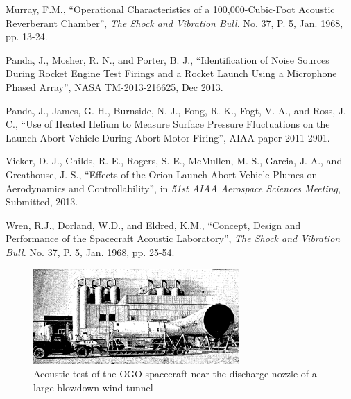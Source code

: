 \documentclass[]{aiaa-tc}%
\begin{document}
\begin{thebibliography}{9}
Murray, F.M.,  ``Operational Characteristics of a 100,000-Cubic-Foot Acoustic Reverberant Chamber'', {\it The Shock and Vibration Bull.} No. 37, P. 5, Jan. 1968, pp. 13-24.

Panda, J., Mosher, R. N., and Porter, B. J., ``Identification of Noise Sources During Rocket Engine Test Firings and a Rocket Launch Using a Microphone Phased Array'', NASA TM-2013-216625, Dec 2013.

Panda, J., James, G. H., Burnside, N. J., Fong, R. K., Fogt, V. A., and Ross, J. C., ``Use of Heated Helium to Measure Surface Pressure Fluctuations on the Launch Abort Vehicle During Abort Motor Firing'', AIAA paper 2011-2901.

Vicker, D. J., Childs, R. E., Rogers, S. E., McMullen, M. S., Garcia, J. A., and Greathouse, J. S.,  ``Effects of the Orion Launch Abort Vehicle Plumes on Aerodynamics and Controllability'', in {\it 51st AIAA Aerospace Sciences Meeting}, Submitted, 2013.

Wren, R.J., Dorland, W.D., and Eldred, K.M., ``Concept, Design and Performance of the Spacecraft Acoustic Laboratory'', {\it The Shock and Vibration Bull.} No. 37, P. 5, Jan. 1968, pp. 25-54.




\end{thebibliography}




\begin{figure}[htb]
\begin{center}
\includegraphics[width=0.7\textwidth]{Images/Himelblau_Fig36.png}
\caption{Acoustic test of the OGO spacecraft near the discharge nozzle of a large blowdown wind tunnel\cite{SpaceVehicleAeroacousticVibrationPrediction}}
\label{FreeFieldTest}
\end{center}
\end{figure}
\end{document}
